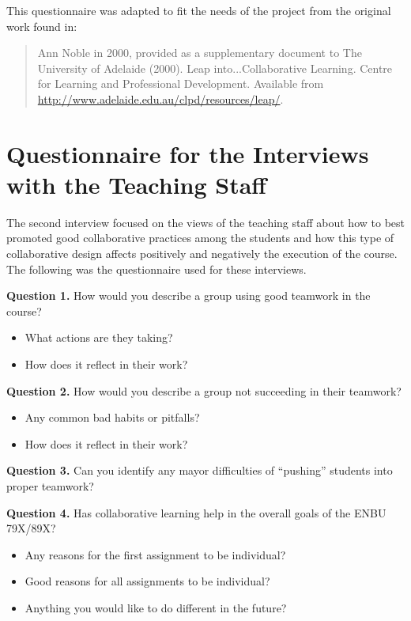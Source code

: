 This questionnaire was adapted to fit the needs of the project from the original work found in:

\begin{quote}
    Ann Noble in 2000, provided as a supplementary document to The University of Adelaide (2000). Leap into...Collaborative Learning. Centre for Learning and Professional Development.
    Available from \url{http://www.adelaide.edu.au/clpd/resources/leap/}.
\end{quote}

\section{Questionnaire for the Interviews with the Teaching Staff \label{sec:C-2}}

The second interview focused on the views of the teaching staff about how to best promoted good collaborative practices among the students and how this type of collaborative design affects
positively and negatively the execution of the course. The following was the questionnaire used for these interviews.

\textbf{Question 1.} How would you describe a group using good teamwork in the course?

\begin{itemize}
    \item What actions are they taking?
    \item How does it reflect in their work?
\end{itemize}

\textbf{Question 2.} How would you describe a group not succeeding in their teamwork?

\begin{itemize}
    \item Any common bad habits or pitfalls?
    \item How does it reflect in their work?
\end{itemize}

\textbf{Question 3.} Can you identify any mayor difficulties of “pushing” students into proper teamwork?

\textbf{Question 4.} Has collaborative learning help in the overall goals of the ENBU 79X/89X?

\begin{itemize}
    \item Any reasons for the first assignment to be individual?
    \item Good reasons for all assignments to be individual?
    \item Anything you would like to do different in the future?
\end{itemize}

